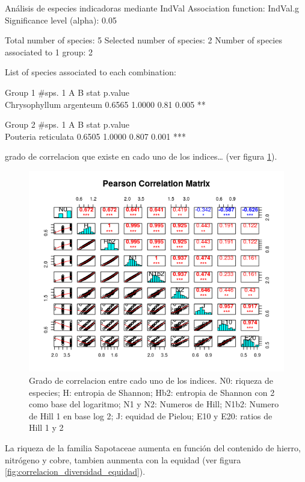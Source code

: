 \documentclass[11pt,]{article}
\begin{document}
Análisis de especies indicadoras mediante IndVal Association function:
IndVal.g Significance level (alpha): 0.05

Total number of species: 5 Selected number of species: 2 Number of
species associated to 1 group: 2

List of species associated to each combination:

Group 1 \#sps. 1 A B stat p.value\\
Chrysophyllum argenteum 0.6565 1.0000 0.81 0.005 **

Group 2 \#sps. 1 A B stat p.value\\
Pouteria reticulata 0.6505 1.0000 0.807 0.001 ***

grado de correlacion que existe en cado uno de los indices\ldots{} (ver
figura \ref{fig:correlacion_indices}).

\begin{figure}
\centering
\includegraphics[width=1.00000\textwidth]{correlacion_pearson.png}
\caption{Grado de correlacion entre cado uno de los indices. N0: riqueza
de especies; H: entropia de Shannon; Hb2: entropia de Shannon con 2 como
base del logaritmo; N1 y N2: Numeros de Hill; N1b2: Numero de Hill 1 en
base log 2; J: equidad de Pielou; E10 y E20: ratios de Hill 1 y 2
\label{fig:correlacion_indices}}
\end{figure}

La riqueza de la familia Sapotaceae aumenta en función del contenido de
hierro, nitrógeno y cobre, tambien aunmenta con la equidad (ver figura
\ref{fig:correlacion_diversidad_equidad}).
\end{document}

